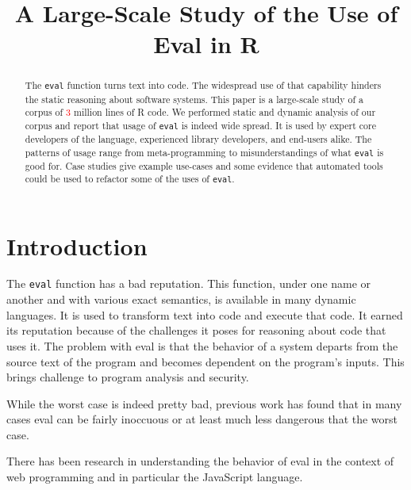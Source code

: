\documentclass[conference]{IEEEtran}
\begin{document}
\title{A Large-Scale Study of the Use of Eval in R}
\author{\vspace{-.8cm}%
}  
\maketitle

\renewcommand{\c}[1]{\lstinline{#1}\xspace}
\newcommand{\miss}[1]{{\textcolor{red}{#1}}\xspace}
\newcommand{\eval}{\c{eval}}

\begin{abstract}
  The \c{eval} function turns text into code. The widespread use of that
  capability hinders the static reasoning about software systems. This paper
  is a large-scale study of a corpus of \miss{3} million lines of R code.
  We performed static and dynamic analysis of our corpus and report that
  usage of \c{eval} is indeed wide spread. It is used by expert core
  developers of the language, experienced library developers, and end-users
  alike. The patterns of usage range from meta-programming to
  misunderstandings of what \c{eval} is good for. Case studies give example
  use-cases and some evidence that automated tools could be used to refactor
  some of the uses of \c{eval}.
\end{abstract}

\section{Introduction}

The \c{eval} function has a bad reputation. This function, under one name or
another and with various exact semantics, is available in many dynamic
languages. It is used to transform text into code and execute that code.  It
earned its reputation because of the challenges it poses for reasoning about
code that uses it.  The problem with eval is that the behavior of a system
departs from the source text of the program and becomes dependent on the
program's inputs. This brings challenge to program analysis and security.

While the worst case is indeed pretty bad, previous work has found that
in many cases eval can be fairly inoccuous or at least much less dangerous
that the worst case.

There has been research in understanding the behavior of eval in the context
of web programming and in particular the JavaScript language.
\end{document}

